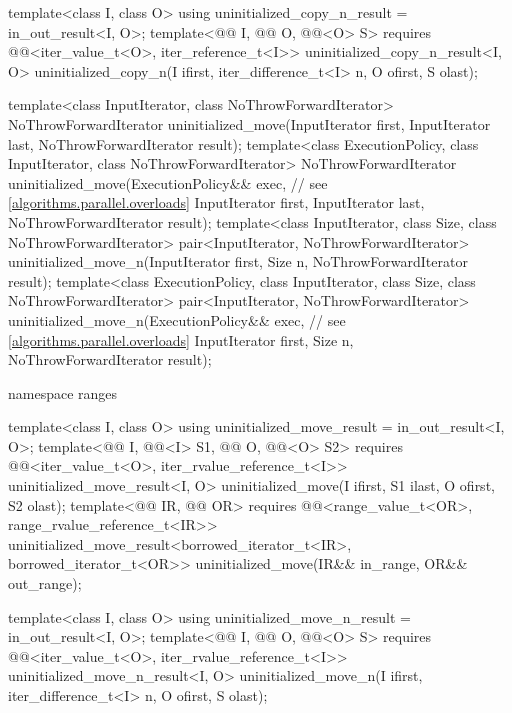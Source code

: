 \begin{codeblock}
{{    template<class I, class O>
      using uninitialized_copy_n_result = in_out_result<I, O>;
    template<@@ I, @@ O, @@<O> S>
      requires @@<iter_value_t<O>, iter_reference_t<I>>
        uninitialized_copy_n_result<I, O>
          uninitialized_copy_n(I ifirst, iter_difference_t<I> n, O ofirst, S olast);
  }

  template<class InputIterator, class NoThrowForwardIterator>
    NoThrowForwardIterator uninitialized_move(InputIterator first, InputIterator last,
                                              NoThrowForwardIterator result);
  template<class ExecutionPolicy, class InputIterator, class NoThrowForwardIterator>
    NoThrowForwardIterator uninitialized_move(ExecutionPolicy&& exec,   // see \ref{algorithms.parallel.overloads}
                                              InputIterator first, InputIterator last,
                                              NoThrowForwardIterator result);
  template<class InputIterator, class Size, class NoThrowForwardIterator>
    pair<InputIterator, NoThrowForwardIterator>
      uninitialized_move_n(InputIterator first, Size n, NoThrowForwardIterator result);
  template<class ExecutionPolicy, class InputIterator, class Size, class NoThrowForwardIterator>
    pair<InputIterator, NoThrowForwardIterator>
      uninitialized_move_n(ExecutionPolicy&& exec,              // see \ref{algorithms.parallel.overloads}
                           InputIterator first, Size n, NoThrowForwardIterator result);

  namespace ranges {
    template<class I, class O>
      using uninitialized_move_result = in_out_result<I, O>;
    template<@@ I, @@<I> S1,
             @@ O, @@<O> S2>
      requires @@<iter_value_t<O>, iter_rvalue_reference_t<I>>
        uninitialized_move_result<I, O>
          uninitialized_move(I ifirst, S1 ilast, O ofirst, S2 olast);
    template<@@ IR, @@ OR>
      requires @@<range_value_t<OR>, range_rvalue_reference_t<IR>>
        uninitialized_move_result<borrowed_iterator_t<IR>, borrowed_iterator_t<OR>>
          uninitialized_move(IR&& in_range, OR&& out_range);

    template<class I, class O>
      using uninitialized_move_n_result = in_out_result<I, O>;
    template<@@ I,
             @@ O, @@<O> S>
      requires @@<iter_value_t<O>, iter_rvalue_reference_t<I>>
        uninitialized_move_n_result<I, O>
          uninitialized_move_n(I ifirst, iter_difference_t<I> n, O ofirst, S olast);
  }

}
\end{codeblock}
